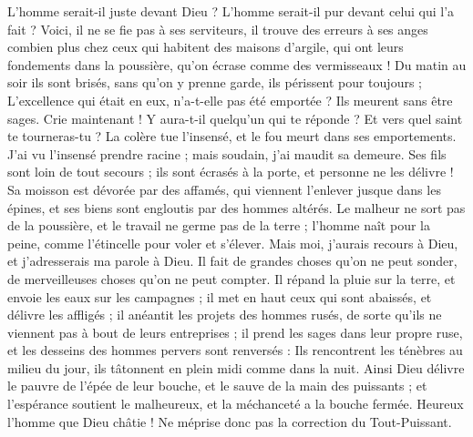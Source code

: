 \begin{multicols}{2}
L'homme serait-il juste devant Dieu ? L'homme serait-il pur devant celui qui l'a fait ?
Voici, il ne se fie pas à ses serviteurs, il trouve des erreurs à ses anges
combien plus chez ceux qui habitent des maisons d'argile, qui ont leurs fondements dans la poussière, qu'on écrase comme des vermisseaux !
Du matin au soir ils sont brisés, sans qu'on y prenne garde, ils périssent pour toujours ;
L'excellence qui était en eux, n'a-t-elle pas été emportée ? Ils meurent sans être sages. 
\VerseOne{}Crie maintenant ! Y aura-t-il quelqu'un qui te réponde ? Et vers quel saint te tourneras-tu ?
La colère tue l'insensé, et le fou meurt dans ses emportements.
J'ai vu l'insensé prendre racine ; mais soudain, j'ai maudit sa demeure.
Ses fils sont loin de tout secours ; ils sont écrasés à la porte, et personne ne les délivre !
Sa moisson est dévorée par des affamés, qui viennent l'enlever jusque dans les épines, et ses biens sont engloutis par des hommes altérés.
Le malheur ne sort pas de la poussière, et le travail ne germe pas de la terre ;
l'homme naît pour la peine, comme l'étincelle pour voler et s'élever.
Mais moi, j'aurais recours à Dieu, et j'adresserais ma parole à Dieu.
Il fait de grandes choses qu'on ne peut sonder, de merveilleuses choses qu'on ne peut compter.
Il répand la pluie sur la terre, et envoie les eaux sur les campagnes ;
il met en haut ceux qui sont abaissés, et délivre les affligés ;
il anéantit les projets des hommes rusés, de sorte qu'ils ne viennent pas à bout de leurs entreprises ;
il prend les sages dans leur propre ruse, et les desseins des hommes pervers sont renversés :
Ils rencontrent les ténèbres au milieu du jour, ils tâtonnent en plein midi comme dans la nuit.
Ainsi Dieu délivre le pauvre de l'épée de leur bouche, et le sauve de la main des puissants ;
et l'espérance soutient le malheureux, et la méchanceté a la bouche fermée.
Heureux l'homme que Dieu châtie ! Ne méprise donc pas la correction du Tout-Puissant.

\end{multicols}
